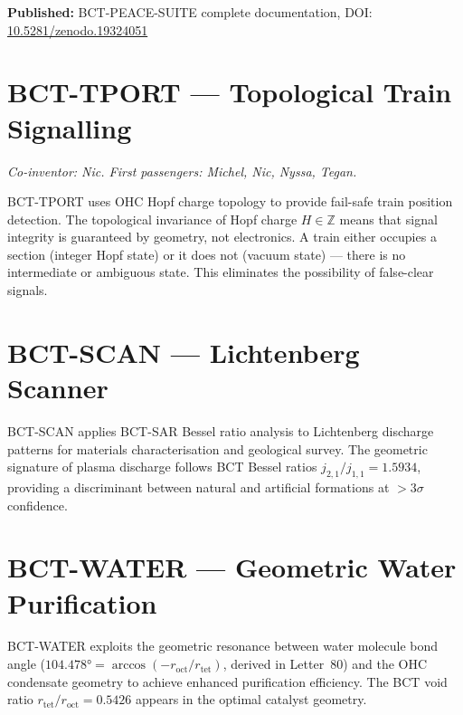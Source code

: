 \documentclass[aps,prl,twocolumn,showpacs,preprintnumbers]{revtex4-2}
\newcommand{\roct}{r_{\mathrm{oct}}}
\newcommand{\rtet}{r_{\mathrm{tet}}}
\begin{document}
\medskip
\noindent\textbf{Published:} BCT-PEACE-SUITE complete documentation,
DOI: \href{https://doi.org/10.5281/zenodo.19324051}{10.5281/zenodo.19324051}

\section{BCT-TPORT --- Topological Train Signalling}
\noindent\textit{Co-inventor: Nic. First passengers: Michel, Nic, Nyssa, Tegan.}

\medskip
BCT-TPORT uses OHC Hopf charge topology to provide fail-safe train
position detection. The topological invariance of Hopf charge $H \in
\mathbb{Z}$ means that signal integrity is guaranteed by geometry, not
electronics. A train either occupies a section (integer Hopf state) or
it does not (vacuum state) --- there is no intermediate or ambiguous
state. This eliminates the possibility of false-clear signals.

\section{BCT-SCAN --- Lichtenberg Scanner}

BCT-SCAN applies BCT-SAR Bessel ratio analysis to Lichtenberg
discharge patterns for materials characterisation and geological survey.
The geometric signature of plasma discharge follows BCT Bessel ratios
$j_{2,1}/j_{1,1} = 1.5934$, providing a discriminant between natural
and artificial formations at $>3\sigma$ confidence.

\section{BCT-WATER --- Geometric Water Purification}

BCT-WATER exploits the geometric resonance between water molecule
bond angle ($104.478° = \arccos(-\roct/\rtet)$, derived in Letter~80)
and the OHC condensate geometry to achieve enhanced purification
efficiency. The BCT void ratio $\rtet/\roct = 0.5426$ appears in
the optimal catalyst geometry.
\end{document}
